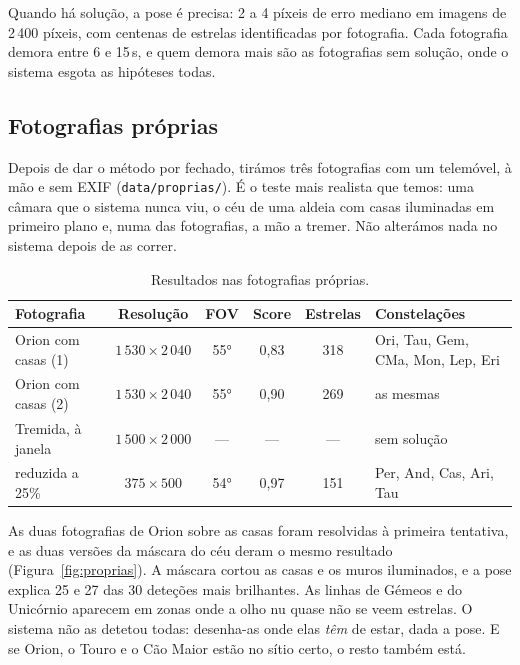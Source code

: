 \documentclass[11pt,a4paper]{article}
\begin{document}
Quando há solução, a pose é precisa: 2 a 4 píxeis de erro mediano em imagens
de 2\,400 píxeis, com centenas de estrelas identificadas por fotografia. Cada
fotografia demora entre 6 e 15\,s, e quem demora mais são as fotografias sem
solução, onde o sistema esgota as hipóteses todas.

\subsection{Fotografias próprias}
\label{sec:proprias}

Depois de dar o método por fechado, tirámos três fotografias com um
telemóvel, à mão e sem EXIF (\texttt{data/proprias/}). É o teste mais
realista que temos: uma câmara que o sistema nunca viu, o céu de uma aldeia
com casas iluminadas em primeiro plano e, numa das fotografias, a mão a
tremer. Não alterámos nada no sistema depois de as correr.

\begin{table}[H]
  \centering
  \caption{Resultados nas fotografias próprias.}
  \label{tab:proprias}
  \small
  \begin{tabular}{@{}lccccp{3.6cm}@{}}
    \toprule
    Fotografia & Resolução & FOV & Score & Estrelas & Constelações \\
    \midrule
    Orion com casas (1) & $1\,530\times2\,040$ & 55° & 0,83 & 318 & Ori, Tau, Gem, CMa, Mon, Lep, Eri \\
    Orion com casas (2) & $1\,530\times2\,040$ & 55° & 0,90 & 269 & as mesmas \\
    Tremida, à janela    & $1\,500\times2\,000$ & --- & --- & --- & sem solução \\
    \quad reduzida a 25\% & $375\times500$   & 54° & 0,97 & 151 & Per, And, Cas, Ari, Tau \\
    \bottomrule
  \end{tabular}
\end{table}

As duas fotografias de Orion sobre as casas foram resolvidas à primeira
tentativa, e as duas versões da máscara do céu deram o mesmo resultado
(Figura~\ref{fig:proprias}). A máscara cortou as casas e os muros iluminados,
e a pose explica 25 e 27 das 30 deteções mais brilhantes. As linhas de
Gémeos e do Unicórnio aparecem em zonas onde a olho nu quase não se veem
estrelas. O sistema não as detetou todas: desenha-as onde elas \emph{têm} de
estar, dada a pose. E se Orion, o Touro e o Cão Maior estão no sítio certo,
o resto também está.
\end{document}
